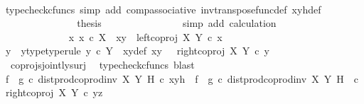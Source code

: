 \begin{isabellebody}
\ \ \ \ \ \ \ \ \ \ \ \ \ \ \isamarkupfalse%
\ {\isacharparenleft}{\kern0pt}typecheck{\isacharunderscore}{\kern0pt}cfuncs{\isacharcomma}{\kern0pt}\ simp\ add{\isacharcolon}{\kern0pt}\ comp{\isacharunderscore}{\kern0pt}associative{}\ inv{\isacharunderscore}{\kern0pt}transpose{\isacharunderscore}{\kern0pt}func{\isacharunderscore}{\kern0pt}def{}\ xyh{\isacharunderscore}{\kern0pt}def{\isacharparenright}{\kern0pt}\isanewline
\ \ \ \ \ \ \ \ \ \ \ \ \isamarkupfalse%
\ \isamarkupfalse%
\ {\isacharquery}{\kern0pt}thesis\isanewline
\ \ \ \ \ \ \ \ \ \ \ \ \ \ \isamarkupfalse%
\ {\isacharparenleft}{\kern0pt}simp\ add{\isacharcolon}{\kern0pt}\ calculation{\isacharparenright}{\kern0pt}\isanewline
\ \ \ \ \ \ \ \ \ \ \isamarkupfalse%
\isanewline
\ \ \ \ \ \ \ \ \ \ \ \ \isamarkupfalse%
\ {\isachardoublequoteopen}{\isasymnexists}x{\isachardot}{\kern0pt}\ x\ {\isasymin}\isactrlsub c\ X\ {\isasymand}\ xy\ {\isacharequal}{\kern0pt}\ left{\isacharunderscore}{\kern0pt}coproj\ X\ Y\ {\isasymcirc}\isactrlsub c\ x{\isachardoublequoteclose}\isanewline
\ \ \ \ \ \ \ \ \ \ \ \ \isamarkupfalse%
\ \isamarkupfalse%
\ y\ \ y{\isacharunderscore}{\kern0pt}type{\isacharbrackleft}{\kern0pt}type{\isacharunderscore}{\kern0pt}rule{\isacharbrackright}{\kern0pt}{\isacharcolon}{\kern0pt}\ {\isachardoublequoteopen}y\ {\isasymin}\isactrlsub c\ Y{\isachardoublequoteclose}\ \ xy{\isacharunderscore}{\kern0pt}def{\isacharcolon}{\kern0pt}\ {\isachardoublequoteopen}xy\ {\isacharequal}{\kern0pt}\ \ right{\isacharunderscore}{\kern0pt}coproj\ X\ Y\ {\isasymcirc}\isactrlsub c\ y{\isachardoublequoteclose}\isanewline
\ \ \ \ \ \ \ \ \ \ \ \ \ \ \isamarkupfalse%
\ \ coprojs{\isacharunderscore}{\kern0pt}jointly{\isacharunderscore}{\kern0pt}surj\ \isamarkupfalse%
\ {\isacharparenleft}{\kern0pt}typecheck{\isacharunderscore}{\kern0pt}cfuncs{\isacharcomma}{\kern0pt}\ blast{\isacharparenright}{\kern0pt}\isanewline
\ \ \ \ \ \ \ \ \ \ \ \ \isamarkupfalse%
\ {\isachardoublequoteopen}{\isacharparenleft}{\kern0pt}f\isactrlsup {\isasymflat}\ {\isasymamalg}\ g\isactrlsup {\isasymflat}\ {\isasymcirc}\isactrlsub c\ dist{\isacharunderscore}{\kern0pt}prod{\isacharunderscore}{\kern0pt}coprod{\isacharunderscore}{\kern0pt}inv{}\ X\ Y\ H{\isacharparenright}{\kern0pt}\ {\isasymcirc}\isactrlsub c\ xyh\ {\isacharequal}{\kern0pt}\ {\isacharparenleft}{\kern0pt}f\isactrlsup {\isasymflat}\ {\isasymamalg}\ g\isactrlsup {\isasymflat}{\isacharparenright}{\kern0pt}\ {\isasymcirc}\isactrlsub c\ {\isacharparenleft}{\kern0pt}dist{\isacharunderscore}{\kern0pt}prod{\isacharunderscore}{\kern0pt}coprod{\isacharunderscore}{\kern0pt}inv{}\ X\ Y\ H\ \ {\isasymcirc}\isactrlsub c\ {\isasymlangle}right{\isacharunderscore}{\kern0pt}coproj\ X\ Y\ {\isasymcirc}\isactrlsub c\ y{\isacharcomma}{\kern0pt}z{\isasymrangle}{\isacharparenright}{\kern0pt}{\isachardoublequoteclose}\isanewline

\end{isabellebody}

